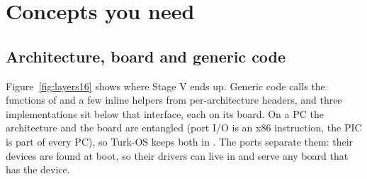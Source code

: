 \documentclass[11pt,a4paper]{article}
\begin{document}
\section{Concepts you need}

\subsection{Architecture, board and generic code}

Figure~\ref{fig:layers16} shows where Stage V ends up. Generic code calls the functions of  and a
few inline helpers from per-architecture headers, and three implementations sit below that interface, each on its
board. On a PC the architecture and the board are entangled (port I/O is an x86 instruction, the PIC is part of every
PC), so Turk-OS keeps both in . The ports separate them: their devices are found at boot, so
their drivers can live in  and serve any board that has the device.
\end{document}
